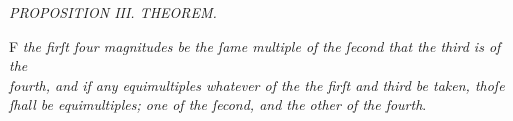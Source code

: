 \documentclass[12pt,preview]{standalone}
\begin{document}
\begin{minipage}{\textwidth}

    \begin{center}
        \textit{PROPOSITION III. THEOREM.}\label{book5pr3} \\
    \end{center}

    \hfill

    \begin{center}
        \raggedright \lettrine[lines=4, loversize=1, nindent=0pt]{}{}F \textit{the firſt four magnitudes be the ſame multiple of the ſecond that the third is of the\\ fourth, and if any equimultiples whatever of the the firſt and third be taken, thoſe\\ ſhall be equimultiples; one of the ſecond, and the other of the fourth}.
    \end{center}

    \hfill

    \hfill


\end{minipage}
\end{document}
